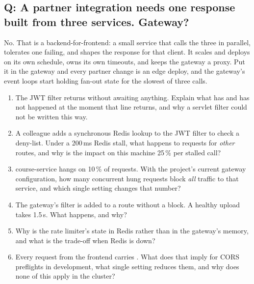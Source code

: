 \subsection*{Q: A partner integration needs one response built from three services. Gateway?}

No. That is a backend-for-frontend: a small service that calls the three
in parallel, tolerates one failing, and shapes the response for that
client. It scales and deploys on its own schedule, owns its own
timeouts, and keeps the gateway a proxy. Put it in the gateway and every
partner change is an edge deploy, and the gateway's event loops start
holding fan-out state for the slowest of three calls.

\begin{quiz}
\begin{enumerate}
  \item The JWT filter returns  without
  awaiting anything. Explain what has and has not happened at the moment
  that line returns, and why a servlet filter could not be written this
  way.
  \item A colleague adds a synchronous Redis lookup to the JWT filter to
  check a deny-list. Under a 200\,ms Redis stall, what happens to
  requests for \emph{other} routes, and why is the impact on this
  machine 25\,\% per stalled call?
  \item course-service hangs on 10\,\% of requests. With the project's
  current gateway configuration, how many concurrent hung requests
  block \emph{all} traffic to that service, and which single setting
  changes that number?
  \item The gateway's  filter is added to a route
  without a  block. A healthy upload takes 1.5\,s.
  What happens, and why?
  \item Why is the rate limiter's state in Redis rather than in the
  gateway's memory, and what is the trade-off when Redis is down?
  \item Every request from the frontend carries .
  What does that imply for CORS preflights in development, what single
  setting reduces them, and why does none of this apply in the cluster?
\end{enumerate}
\end{quiz}
